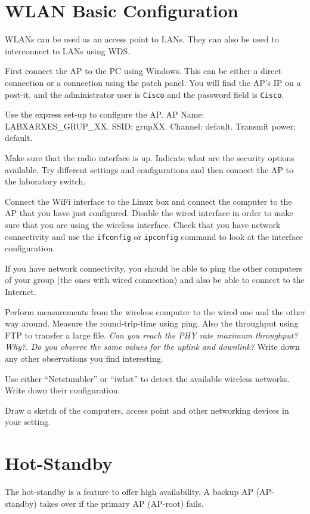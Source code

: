 \section{WLAN Basic Configuration}

WLANs can be used as an access point to LANs.
They can also be used to interconnect to LANs using WDS.

First connect the AP to the PC using Windows.
This can be either a direct connection or a connection using the patch panel.
You will find the AP's IP on a post-it, and the administrator user is \texttt{Cisco} and the password field is \texttt{Cisco}.

Use the express set-up to configure the AP.
AP Name: LABXARXES\_GRUP\_XX.
SSID: grupXX.
Channel: default.
Transmit power: default.

Make sure that the radio interface is up.
Indicate what are the security options available.
Try different settings and configurations and then connect the AP to the laboratory switch.

Connect the WiFi interface to the Linux box and connect the computer to the AP that you have just configured.
Disable the wired interface in order to make sure that you are using the wireless interface.
Check that you have network connectivity and use the \texttt{ifconfig} or \texttt{ipconfig} command to look at the interface configuration.

If you have network connectivity, you should be able to ping the other computers of your group (the ones with wired connection) and also be able to connect to the Internet.

Perform measurements from the wireless computer to the wired one and the other way around.
Measure the round-trip-time using ping.
Also the throughput using FTP to transfer a large file.
\emph{Can you reach the PHY rate maximum throughput? Why?}.
\emph{Do you observe the same values for the uplink and downlink?}
Write down any other observations you find interesting.

Use either ``Netstumbler'' or ``iwlist'' to detect the available wireless networks.
Write down their configuration.

Draw a sketch of the computers, access point and other networking devices in your setting.

\section{Hot-Standby}

The hot-standby is a feature to offer high availability.
A backup AP (AP-standby) takes over if the primary AP (AP-root) fails.

